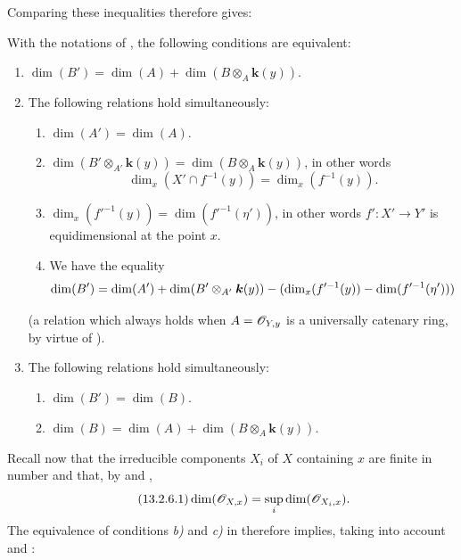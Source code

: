 
Comparing these inequalities therefore gives:

\begin{lemma}[13.2.5]
\label{IV.13.2.5}
With the notations of , the following conditions are equivalent:
\begin{enumerate}[label=\emph{\alph*)}]
  \item $\dim(B')=\dim(A)+\dim(B\otimes_A\boldsymbol{k}(y))$.
  \item The following relations hold simultaneously:
  \begin{enumerate}[label=\textup{(\roman*)}]
    \item $\dim(A')=\dim(A)$.
    \item $\dim(B'\otimes_{A'}\boldsymbol{k}(y))=\dim(B\otimes_A\boldsymbol{k}(y))$, in other words
    \[
      \dim_x(X'\cap f^{-1}(y))=\dim_x(f^{-1}(y)).
    \]
    \item $\dim_x(f'^{-1}(y))=\dim(f'^{-1}(\eta'))$, in other words $f':X'\to Y'$ is equidimensional  at the point $x$.
    \item We have the equality
    \[
      \dim(B')=\dim(A')+\dim(B'\otimes_{A'}\boldsymbol{k}(y))-(\dim_x(f'^{-1}(y))-\dim(f'^{-1}(\eta')))
    \]
  \end{enumerate}
  (a relation which always holds when $A=\mathscr{O}_{Y,y}$ is a universally catenary ring, by virtue of ).
  \item The following relations hold simultaneously:
  \begin{enumerate}[label=\textup{(\roman*)}]
    \item $\dim(B')=\dim(B)$.
    \item $\dim(B)=\dim(A)+\dim(B\otimes_A\boldsymbol{k}(y))$.
  \end{enumerate}
\end{enumerate}
\end{lemma}

\begin{env}[13.2.6]
\label{IV.13.2.6}
Recall now that the irreducible components $X_i$ of $X$ containing $x$ are finite in number and that, by  and ,
\[
\label{IV.13.2.6.1}
\tag{13.2.6.1}
  \dim(\mathscr{O}_{X,x})=\sup_i\dim(\mathscr{O}_{X_i,x}).
\]
The equivalence of conditions \emph{b)} and \emph{c)} in  therefore implies, taking into account  and :
\end{env}

